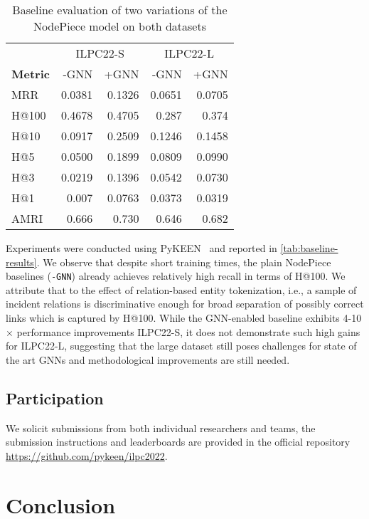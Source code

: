 \documentclass[sigconf,screen]{acmart}
\begin{document}
\begin{table}[]
    \centering
    \begin{tabular}{lrr|rr}
        \toprule
         & \multicolumn{2}{c}{ILPC22-S} & \multicolumn{2}{c}{ILPC22-L} \\
        \textbf{Metric} & -GNN & +GNN               & -GNN & +GNN \\
        \midrule
        MRR   & 0.0381 & 0.1326 & 0.0651 & 0.0705\\
        H@100 & 0.4678 & 0.4705 & 0.287  & 0.374\\
        H@10  & 0.0917 & 0.2509	& 0.1246 & 0.1458\\
        H@5   & 0.0500 & 0.1899	& 0.0809 & 0.0990\\
        H@3   & 0.0219 & 0.1396	& 0.0542 & 0.0730\\
        H@1   & 0.007  & 0.0763	& 0.0373 & 0.0319\\
AMRI  & 0.666  & 0.730	& 0.646  & 0.682\\
        \bottomrule
    \end{tabular}
    \caption{Baseline evaluation of two variations of the NodePiece model on both datasets}
    \label{tab:baseline-results}
\end{table}

Experiments were conducted using PyKEEN~\cite{pykeen} and reported in  \autoref{tab:baseline-results}.
We observe that despite short training times, the plain NodePiece baselines (\texttt{-GNN}) already achieves relatively high recall in terms of H@100.
We attribute that to the effect of relation-based entity tokenization, i.e., a sample of incident relations is discriminative enough for broad separation of possibly correct links which is captured by H@100. 
While the GNN-enabled baseline exhibits 4-10$\times$ performance improvements ILPC22-S, it does not demonstrate such high gains for ILPC22-L, suggesting that the large dataset still poses challenges for state of the art GNNs and methodological improvements are still needed.

\subsection{Participation}

We solicit submissions from both individual researchers and teams, the submission instructions and leaderboards are provided in the official repository \url{https://github.com/pykeen/ilpc2022}. 

\section{Conclusion}
\end{document}
